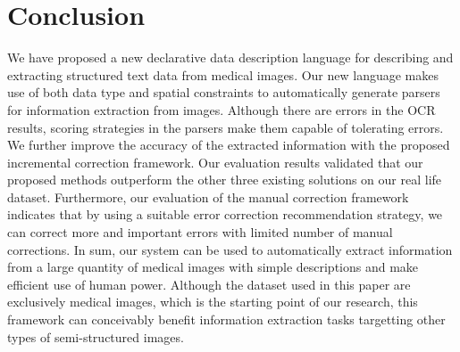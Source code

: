 \section{Conclusion}
\label{sec:conclude}
We have proposed a new declarative 
data description language for describing and extracting 
structured text data from medical images. 
Our new language makes use of both data type and 
spatial constraints to automatically 
generate parsers for information extraction from 
images. Although there are errors in the OCR results, 
scoring strategies in the parsers make them capable of 
tolerating errors. 
We further improve the accuracy of the 
extracted information with the proposed incremental correction framework. 
Our evaluation results validated 
that our proposed methods outperform the other three 
existing solutions on our real life dataset. 
Furthermore, our evaluation of the manual correction framework indicates that 
by using a suitable error correction recommendation strategy, 
we can correct more and important errors with limited number of 
manual corrections. In sum, our system can be used to automatically extract 
information from a large quantity of medical images with simple 
descriptions and make efficient use of human power. 
Although the dataset used in this paper are exclusively
medical images, which is the starting point of our research, 
this framework can conceivably benefit 
information extraction tasks targetting other types of
semi-structured images.


